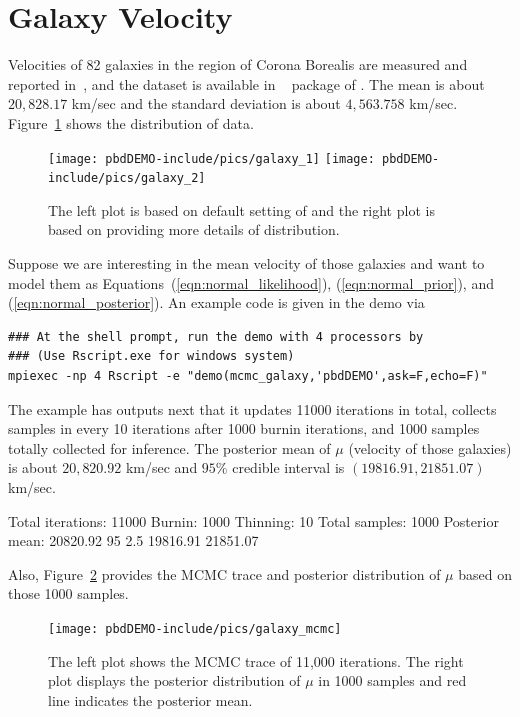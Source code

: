 \section[Galaxy Velocity]{Galaxy Velocity}
\label{sec:galaxy}

Velocities of 82 galaxies in the region of Corona Borealis are
measured and reported in~\citep{Roeder1990}, and the  dataset is
available in ~ package of .
The mean is about $20,828.17$ km/sec and the standard deviation is about
$4,563.758$ km/sec. Figure~\ref{fig:galaxy} shows the distribution of data.
\begin{figure}[ht]
\centering
  \texttt{[image: pbdDEMO-include/pics/galaxy\_1]}
  \texttt{[image: pbdDEMO-include/pics/galaxy\_2]}
\caption[Histograms of velocities of 82 galaxies]{The left plot is based on
default setting of  and the right plot is based on
 providing more details of distribution.}
\label{fig:galaxy}
\end{figure}

Suppose we are interesting in the mean velocity of those galaxies and want to
model them as Equations~(\ref{eqn:normal_likelihood}),
(\ref{eqn:normal_prior}), and (\ref{eqn:normal_posterior}).
An example code is given in the  demo via
\begin{lstlisting}
### At the shell prompt, run the demo with 4 processors by
### (Use Rscript.exe for windows system)
mpiexec -np 4 Rscript -e "demo(mcmc_galaxy,'pbdDEMO',ask=F,echo=F)"
\end{lstlisting}
The example has outputs next that it updates 11000 iterations
in total, collects samples in every 10 iterations after 1000 burnin iterations,
and 1000 samples totally collected for inference. The posterior mean of
$\mu$ (velocity of those galaxies) is about $20,820.92$ km/sec and
$95\%$ credible interval is $(19816.91, 21851.07)$ km/sec.
\begin{CodeOutput}
Total iterations: 11000
Burnin: 1000
Thinning: 10
Total samples: 1000
Posterior mean: 20820.92
95%
    2.5%
19816.91 21851.07 
\end{CodeOutput}
Also, Figure~\ref{fig:mcmc_galaxy} provides the MCMC trace and
posterior distribution of $\mu$ based on those 1000 samples.
\begin{figure}[ht]
\centering
  \texttt{[image: pbdDEMO-include/pics/galaxy\_mcmc]}
\caption[MCMC results of velocities of 82 galaxies]{
The left plot shows the MCMC trace of 11,000 iterations.
The right plot displays the posterior distribution of $\mu$ in 1000 samples
and red line indicates the posterior mean.}
\label{fig:mcmc_galaxy}
\end{figure}


